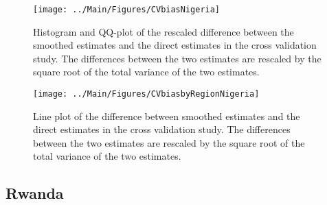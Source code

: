 \documentclass[12pt]{article}\usepackage[]{graphicx}\usepackage[]{color}
\newenvironment{knitrout}{}{} %
\begin{document}
\begin{knitrout}
\color{fgcolor}\begin{figure}[bht]

{\centering \texttt{[image: ../Main/Figures/CVbiasNigeria]} 

}

\caption[Histogram and QQ-plot of the rescaled difference between the smoothed estimates and the direct estimates in the cross validation study]{Histogram and QQ-plot of the rescaled difference between the smoothed estimates and the direct estimates in the cross validation study. The differences between the two estimates are rescaled by the square root of the total variance of the two estimates.}\label{fig:unnamed-chunk-269}
\end{figure}


\end{knitrout}

\begin{knitrout}
\color{fgcolor}\begin{figure}[bht]

{\centering \texttt{[image: ../Main/Figures/CVbiasbyRegionNigeria]} 

}

\caption[Line plot of the difference between smoothed estimates and the direct estimates in the cross validation study]{Line plot of the difference between smoothed estimates and the direct estimates in the cross validation study. The differences between the two estimates are rescaled by the square root of the total variance of the two estimates.}\label{fig:unnamed-chunk-270}
\end{figure}


\end{knitrout}


\clearpage
\subsection{Rwanda}


\end{document}
